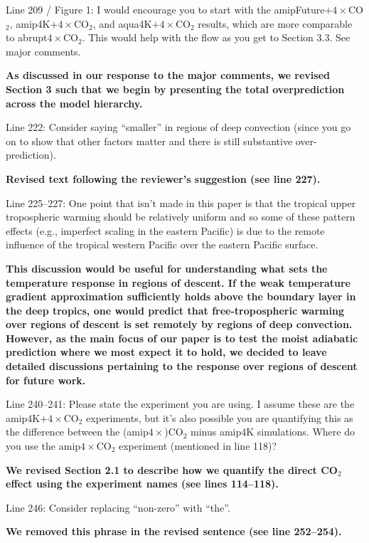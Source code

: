 \documentclass[11pt]{article}
\begin{document}
Line 209 / Figure 1: I would encourage you to start with the amipFuture\(+4\times\)CO\(_2\), amip4K\(+4\times\)CO\(_2\), and aqua4K\(+4\times\)CO\(_2\) results, which are more comparable to abrupt\(4\times\)CO\(_2\). This would help with the flow as you get to Section 3.3. See major comments.

\textbf{As discussed in our response to the major comments, we revised Section 3 such that we begin by presenting the total overprediction across the model hierarchy.}

Line 222: Consider saying ``smaller'' in regions of deep convection (since you go on to show that other factors matter and there is still substantive over-prediction).

\textbf{Revised text following the reviewer's suggestion (see line 227).}

Line 225--227: One point that isn't made in this paper is that the tropical upper tropospheric warming should be relatively uniform and so some of these pattern effects (e.g., imperfect scaling in the eastern Pacific) is due to the remote influence of the tropical western Pacific over the eastern Pacific surface.

\textbf{This discussion would be useful for understanding what sets the temperature response in regions of descent. If the weak temperature gradient approximation sufficiently holds above the boundary layer in the deep tropics, one would predict that free-tropospheric warming over regions of descent is set remotely by regions of deep convection. However, as the main focus of our paper is to test the moist adiabatic prediction where we most expect it to hold, we decided to leave detailed discussions pertaining to the response over regions of descent for future work.}

Line 240--241: Please state the experiment you are using. I assume these are the amip4K\(+4\times\)CO\(_2\) experiments, but it's also possible you are quantifying this as the difference between the (amip\(4\times\))CO\(_2\) minus amip4K simulations. Where do you use the amip\(4\times\)CO\(_2\) experiment (mentioned in line 118)?

\textbf{We revised Section 2.1 to describe how we quantify the direct CO\(_2\) effect using the experiment names (see lines 114--118).}

Line 246: Consider replacing ``non-zero'' with ``the''.

\textbf{We removed this phrase in the revised sentence (see line 252--254).}
\end{document}
